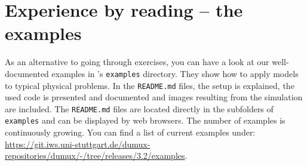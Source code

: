 \section{Experience \Dumux by reading -- the \Dumux examples}
As an alternative to going through exercises, you can have a look at our well-documented \Dumux examples in \Dumux's \texttt{examples} directory. They show how to apply \Dumux models to typical physical problems. In the \texttt{README.md} files, the setup is explained, the used code is presented and documented and images resulting from the simulation are included. The \texttt{README.md} files are located directly in the subfolders of \texttt{examples} and can be displayed by web browsers. The number of examples is continuously growing.
You can find a list of current examples under: \url{https://git.iws.uni-stuttgart.de/dumux-repositories/dumux/-/tree/releases/3.2/examples}.
